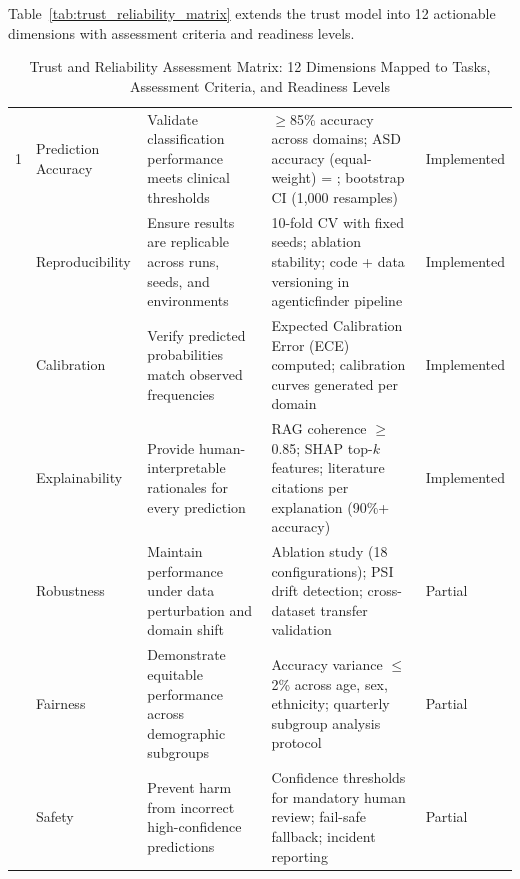 \iffalse
Table~\ref{tab:trust_reliability_matrix} extends the trust model into 12 actionable dimensions with assessment criteria and readiness levels.

\begin{table}[!htbp]
\tablestripes
\tablefontsize
\caption[Trust and Reliability Assessment Matrix]{Trust and Reliability Assessment Matrix: 12 Dimensions Mapped to Tasks, Assessment Criteria, and Readiness Levels}
%
\begin{tabularx}{\textwidth}{@{} p{0.4cm} >{\raggedright\arraybackslash}p{1.6cm} L L >{\raggedright\arraybackslash}p{1.6cm} @{}}
\toprule
\thead{\#} &  &  &  &  \\
 & Prediction Accuracy & Validate classification performance meets clinical thresholds & $\geq$85\% accuracy across domains; ASD accuracy (equal-weight) = \asdacc{}; bootstrap CI (1{,}000 resamples) & Implemented \\
 & Reproducibility & Ensure results are replicable across runs, seeds, and environments & 10-fold CV with fixed seeds; ablation stability; code + data versioning in agenticfinder pipeline & Implemented \\
 & Calibration & Verify predicted probabilities match observed frequencies & Expected Calibration Error (ECE) computed; calibration curves generated per domain & Implemented \\
 & Explainability & Provide human-interpretable rationales for every prediction & RAG coherence $\geq$0.85; SHAP top-$k$ features; literature citations per explanation (90\%+ accuracy) & Implemented \\
 & Robustness & Maintain performance under data perturbation and domain shift & Ablation study (18 configurations); PSI drift detection; cross-dataset transfer validation & Partial \\
 & Fairness & Demonstrate equitable performance across demographic subgroups & Accuracy variance $\leq$2\% across age, sex, ethnicity; quarterly subgroup analysis protocol & Partial \\
 & Safety & Prevent harm from incorrect high-confidence predictions & Confidence thresholds for mandatory human review; fail-safe fallback; incident reporting & Partial \\

\end{tabularx}
\end{table}
